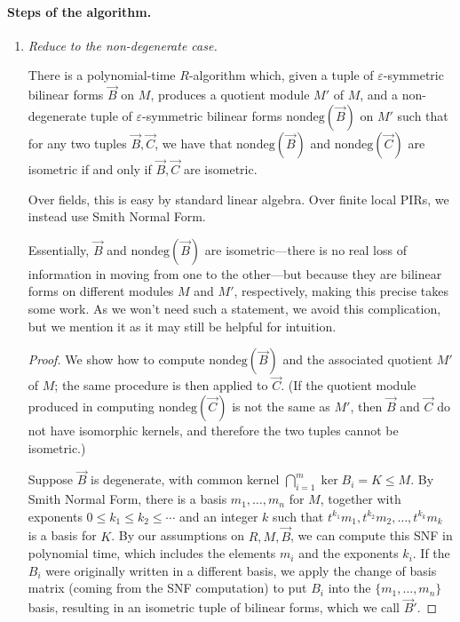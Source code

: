\paragraph{Steps of the algorithm.}
\begin{enumerate}
\item \textit{Reduce to the non-degenerate case.} 

\begin{lemma}
There is a polynomial-time $R$-algorithm which, given a tuple of $\varepsilon$-symmetric bilinear forms $\vec{B}$ on $M$, produces a quotient module $M'$ of $M$, and a non-degenerate tuple of $\varepsilon$-symmetric bilinear forms $\text{nondeg}(\vec{B})$ on $M'$ such that for any two tuples $\vec{B}, \vec{C}$, we have that $\text{nondeg}(\vec{B})$ and $\text{nondeg}(\vec{C})$ are isometric if and only if $\vec{B}, \vec{C}$ are isometric.
\end{lemma}

Over fields, this is easy by standard linear algebra. Over finite local PIRs, we instead use Smith Normal Form.

Essentially, $\vec{B}$ and $\text{nondeg}(\vec{B})$ are isometric---there is no real loss of information in moving from one to the other---but because they are bilinear forms on different modules $M$ and $M'$, respectively, making this precise takes some work. As we won't need such a statement, we avoid this complication, but we mention it as it may still be helpful for intuition.

\begin{proof}
We show how to compute $\text{nondeg}(\vec{B})$ and the associated quotient $M'$ of $M$; the same procedure is then applied to $\vec{C}$. (If the quotient module produced in computing $\text{nondeg}(\vec{C})$ is not the same as $M'$, then $\vec{B}$ and $\vec{C}$ do not have isomorphic kernels, and therefore the two tuples cannot be isometric.)

Suppose $\vec{B}$ is degenerate, with common kernel $\bigcap_{i=1}^m \ker B_i = K \leq M$. By Smith Normal Form, there is a basis $m_1,\dotsc,m_n$ for $M$, together with exponents $0 \leq k_1 \leq k_2 \leq \dotsb $ and an integer $k$ such that $t^{k_1} m_1, t^{k_2} m_2, \dotsc, t^{k_k} m_k$ is a basis for $K$. By our assumptions on $R,M,\vec{B}$, we can compute this SNF in polynomial time, which includes the elements $m_i$ and the exponents $k_i$. If the $B_i$ were originally written in a different basis, we apply the change of basis matrix (coming from the SNF computation) to put $B_i$ into the $\{m_1, \dotsc, m_n\}$ basis, resulting in an isometric tuple of bilinear forms, which we call $\vec{B}'$.


\end{proof}
\end{enumerate}
